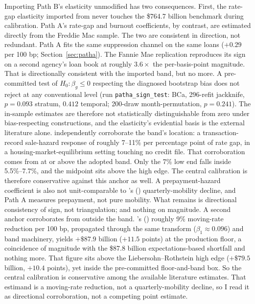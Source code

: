 \documentclass[12pt]{article}
\newcommand{\citepos}[1]{\citeauthor{#1}'s (\citeyear{#1})}
\begin{document}
Importing Path B's elasticity unmodified has two consequences. First, the rate-gap elasticity imported from \citet{liebersohn2024} never touches the \$764.7 billion benchmark during calibration. Path A's rate-gap and burnout coefficients, by contrast, are estimated directly from the Freddie Mac sample. The two are consistent in direction, not redundant. Path A fits the same suppression channel on the same loans ($+0.29$ per 100 bp; Section~\ref{sec:patha}). The Fannie Mae replication reproduces its sign on a second agency's loan book at roughly $3.6\times$ the per-basis-point magnitude. That is directionally consistent with the imported band, but no more. A pre-committed test of $H_0\!: \beta_g \le 0$ respecting the diagnosed bootstrap bias does not reject at any conventional level (run \texttt{patha\_sign\_test}: BCa, 296-refit jackknife, $p = 0.093$ stratum, $0.412$ temporal; 200-draw month-permutation, $p = 0.241$). The in-sample estimates are therefore not statistically distinguishable from zero under bias-respecting constructions, and the elasticity's evidential basis is the external literature alone. \citet{graybill2026} independently corroborate the band's location: a transaction-record sale-hazard response of roughly 7--11\% per percentage point of rate gap, in a housing-market-equilibrium setting touching no credit file. That corroboration comes from at or above the adopted band. Only the 7\% low end falls inside 5.5\%--7.7\%, and the midpoint sits above the high edge. The central calibration is therefore conservative against this anchor as well. A prepayment-hazard coefficient is also not unit-comparable to \citepos{liebersohn2024} quarterly-mobility decline, and Path A measures prepayment, not pure mobility. What remains is directional consistency of sign, not triangulation; and nothing on magnitude. A second anchor corroborates from outside the band. \citepos{fonseca2024} roughly 9\% moving-rate reduction per 100 bp, propagated through the same transform ($\beta_1 \approx 0.096$) and band machinery, yields $+\$87.9$ billion ($+11.5$ points) at the production floor, a coincidence of magnitude with the \$87.8 billion expectations-based shortfall and nothing more. That figure sits above the Liebersohn--Rothstein high edge ($+\$79.5$ billion, $+10.4$ points), yet inside the pre-committed floor-and-band box. So the central calibration is conservative among the available literature estimates. That estimand is a moving-rate reduction, not a quarterly-mobility decline, so I read it as directional corroboration, not a competing point estimate.
\end{document}
